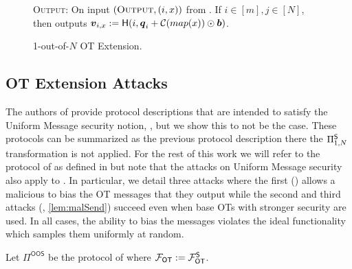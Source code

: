 \begin{figure}[t!]
{\begin{minipage}{0.95\linewidth}
			
			\textsc{Output:} On input $(\textsc{Output}, (i,x))$ from \send. If $i\in[m],j\in[N]$, then \send outputs $\boldsymbol{v}_{i,x}:=\mathsf{H}(i,\boldsymbol{q}_i+\mathcal{C}(map(x))\odot \boldsymbol{b})$.
	\end{minipage}}
	\caption{ 1-out-of-$N$ OT Extension.}
	\label{fig:otExt}
\end{figure}


%			


\subsection{OT Extension Attacks}\label{sec:extAttack}

The authors of \cite{C:KelOrsSch15,RSA:OrrOrsSch17} provide protocol descriptions that are intended to satisfy the Uniform Message security notion, , but we show this to not be the case. These protocols can be summarized as the previous protocol description there the $\Pi^{\mathsf{S}}_{1,N}$ transformation is not applied.  For the rest of this work we will refer to the protocol of \cite{RSA:OrrOrsSch17} as defined in  but note that the attacks on Uniform Message security also apply to \cite[Figure 6, 7]{C:KelOrsSch15}. In particular, we detail three attacks where the first ()  allows a malicious \rec to bias the OT messages that they output while the second and third attacks (, \ref{lem:malSend}) succeed even when base OTs with stronger security are used. In all cases, the ability to bias the messages violates the ideal functionality which samples them uniformly at random.


\begin{definition}\label{def:OOS}
	Let $\Pi^{\textsf{OOS}}$ be the protocol of  where $\mathcal{F}_{\mathsf{OT}}:=\mathcal{F}_{\mathsf{OT}}^\mathsf{S}$.
\end{definition}

